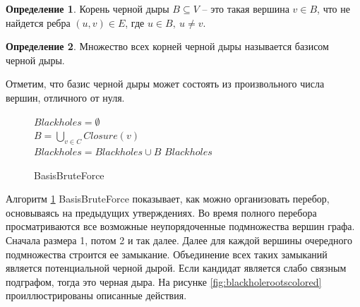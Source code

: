 \documentclass[12pt,a4paper,oneside,openany]{article}
\theoremstyle{definition}
\newtheorem{definition}{Определение}[]
\theoremstyle{lemma}
\theoremstyle{remark}
\begin{document}
\begin{definition}\label{def:blackholeroot}
Корень черной дыры $B \subseteq V$ -- это такая вершина $v \in B$, что не найдется ребра $(u, v) \in E$, где $u \in B,\ u \neq v$.
\end{definition}

\begin{definition}\label{def:blackholebasis}
Множество всех корней черной дыры называется базисом черной дыры.
\end{definition}

Отметим, что базис черной дыры может состоять из произвольного числа вершин, отличного от нуля.

\linespread{1.0}
\begin{figure}[H]
	\begin{center}
		\begin{algorithm}[H]
			\SetAlgoLined

                        $Blackholes = \emptyset$ \\
                         {
                             {
                                $B = \bigcup\limits_{v \in C} Closure(v)$ \\
                                 {
                                    $Blackholes = Blackholes \cup B$
                                }
                            }
                        }
                        \Return $Blackholes$
			\label{alg:basisbruteforce}
			\caption{BasisBruteForce}
		\end{algorithm}
	\end{center}
\end{figure}
\linespread{1.5}

Алгоритм \ref{alg:basisbruteforce} BasisBruteForce показывает, как можно организовать перебор, основываясь на предыдущих утверждениях.
Во время полного перебора просматриваются все возможные неупорядоченные подмножества вершин графа.
Сначала размера 1, потом 2 и так далее.
Далее для каждой вершины очередного подмножества строится ее замыкание.
Объединение всех таких замыканий является потенциальной черной дырой.
Если кандидат является слабо связным подграфом, тогда это черная дыра.
На рисунке \ref{fig:blackholerootscolored} проиллюстрированы описанные действия.
\end{document}

